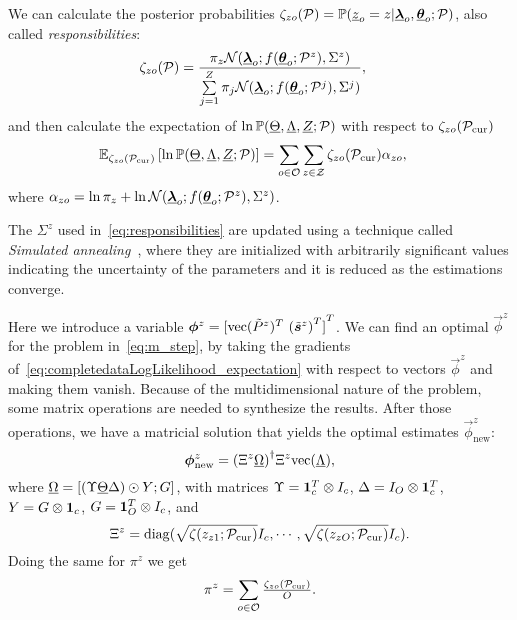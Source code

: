 \documentclass{ifacconf}  %
\begin{document}
We can calculate the posterior probabilities  $\zeta_{zo}(\mathcal{P})=\mathbb{P}(\underline{z}_{o}=z|{\underline{\boldsymbol{\lambda}}}_{o},{\underline{\boldsymbol{\theta}}}_{o};\mathcal{P})$, also called \emph{responsibilities}:
\begin{align}
  \label{eq:responsibilities}
\zeta_{zo}(\set{P})&=\frac{\pi_{z}{\mathcal{N}(\randomvec{\lambda}_{o};f(\randomvec{\theta}_{o};\set{P}^{z}),{\Sigma^{z}})}}{\sum\limits_{j=1}^{Z}\pi_{j}\mathcal{N}(\randomvec{\lambda}_{o};f(\randomvec{\theta}_{o};\set{P}^{j}),{\Sigma^{j}})},
\end{align}
and then calculate the expectation of ${\ln\mathbb{P}(\underline{\Theta},\underline{\Lambda},\underline{Z};\mathcal{P})}$ with respect to ${\zeta_{zo}(\mathcal{P}_{\mathrm{cur}})}$ \citep[Chapter 9]{Bishop2006}
\begin{align}
  \label{eq:completedataLogLikelihood_expectation}
\expectation[{\zeta_{zo}(\set{P}_{\mathrm{cur}})}]{\ln\probability{\random{\Theta},\random{\Lambda},\random{Z};\set{P}}}&= \sum_{o\in\set{O}}\sum_{z\in\set{Z}}  \zeta_{zo}(\set{P}_{\mathrm{cur}})\alpha_{zo},
\end{align}
where ${\alpha_{zo}=\ln{\pi_{z}}+\ln{\mathcal{N}({\underline{\boldsymbol{\lambda}}}_{o};f({\underline{\boldsymbol{\theta}}}_{o};\mathcal{P}^{z}),{\Sigma^{z}})}}$.

\begin{remark}
The $\Sigma^{z}$ used in~\eqref{eq:responsibilities} are updated using a technique called \emph{Simulated annealing}~\citep{OzerovFevotte2010}, where they are initialized with arbitrarily significant values indicating the uncertainty of the parameters and it is reduced as the estimations converge.
\end{remark}

Here we introduce a variable ${\vec{\phi}^{z}={[\vectorize{\tilde{P}^{z}}^{T}\ {(\tilde{\vec{s}}^{z})}^{T} ]}^{T}}$.
We can find an optimal $\vec{\phi}^{z}$ for the problem in~\eqref{eq:m_step}, by
taking the gradients of~\eqref{eq:completedataLogLikelihood_expectation} with respect to vectors $\vec{\phi}^{z}$ and making them vanish.
Because of the multidimensional nature of the problem, some matrix operations are needed to synthesize the results.
After those operations, we have a matricial solution that yields the optimal estimates $\vec{\phi}^{z}_{\mathrm{new}}$:
\begin{equation}
  \label{eq:mstepestimation}
  \vec{\phi}^{z}_{\mathrm{new}}=\pseudoinv{(\Xi^{z}\random{\Omega})}\Xi^{z}\vectorize{\random{\Lambda}},
\end{equation}
where
${\underline{\Omega}=[(\Upsilon \underline{\Theta}\Delta)\odot Y;G]}$,
with matrices
${\Upsilon=\mathbf{1}_{c}^{T}\mathbin{\otimes}I_{c}}$,
${\Delta=I_{O}\mathbin{\otimes}\mathbf{1}_{c}^{T}}$,
${Y=G\mathbin{\otimes}\mathbf{1}_{c}}$,
${G=\mathbf{1}_{O}^{T}\mathbin{\otimes}I_{c}}$,
and
\[{\Xi^{z}={\operatorname{diag}(\sqrt{{\zeta(z_{z1};\mathcal{P}_{\mathrm{cur}})}}I_{c},\cdots,\sqrt{{\zeta(z_{zO};\mathcal{P}_{\mathrm{cur}})}}I_{c})}}.\]
Doing the same for $\pi^{z}$ we get
\begin{equation*}
  \label{eq:3}
  \pi^{z}=\sum\limits_{o\in\set{O}}\tfrac{\zeta_{zo}(\set{P}_{\mathrm{cur}})}{O}.
\end{equation*}
\end{document}
